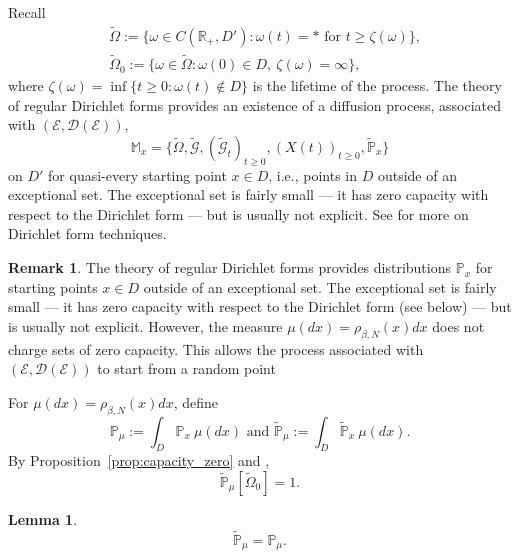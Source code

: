 \documentclass[11pt]{article}
\numberwithin{equation}{section}
\newtheorem{lemma}[theorem]{Lemma}
\theoremstyle{definition}
\newtheorem{remark}[theorem]{Remark}
\begin{document}
Recall 
\[
\begin{split}
    &\tilde\Omega := \{\omega \in C(\mathbb{R}_{+}, D'): \omega(t) = * \text{ for } t\ge \zeta(\omega)\},\\
    &\tilde\Omega_{0} := \{\omega\in \tilde\Omega: \omega(0)\in D,\ \zeta(\omega)=\infty\},
\end{split}
\]
where $\zeta(\omega) = \inf\{t\ge 0: \omega(t)\notin D\}$ is the lifetime of the process.
The theory of regular Dirichlet forms provides an existence of a diffusion process, associated with $(\mathcal{E}, \mathcal{D}(\mathcal{E}))$,
\[
    \mathbb{M}_{x} = \{\tilde\Omega, \tilde{\mathcal{G}},(\tilde{\mathcal{G}}_{t})_{t\ge 0}, (X(t))_{t\ge0}, \tilde{\mathbb{P}}_{x}\}
\]
on $D'$ for quasi-every starting point $x\in D$, i.e., points in $D$ outside of an exceptional set. The exceptional set is fairly small --- it has zero capacity with respect to the Dirichlet form --- but is usually not explicit.  See \cite{fukushima2011dirichlet, ma1992introduction} for more on Dirichlet form techniques.
\begin{remark}
    The theory of regular Dirichlet forms provides distributions $\mathbb{P}_{x}$ for starting points $x\in D$ outside of an exceptional set. The exceptional set is fairly small --- it has zero capacity with respect to the Dirichlet form (see below) --- but is usually not explicit. However, the measure $\mu(dx)=\rho_{\beta,N}(x)dx$ does not charge sets of zero capacity. This allows the process associated with $(\mathcal{E}, \mathcal{D}(\mathcal{E}))$ to start from a random point 
\end{remark}
For $\mu(dx) = \rho_{\beta,N}(x)dx$, define 
\[
    \mathbb{P}_{\mu}:= \int_{D}\mathbb{P}_{x}\ \mu(dx) \text{ and }  \tilde{\mathbb{P}}_{\mu} := \int_{D}\tilde{\mathbb{P}}_{x}\ \mu(dx).
\]
By Proposition~\ref{prop:capacity_zero} and \cite{ma1992introduction},
\[
    \tilde{\mathbb{P}}_{\mu}[\tilde\Omega_{0}]=1.
\]
\begin{lemma}
\[
        \tilde{\mathbb{P}}_{\mu} = \mathbb{P}_{\mu}.
\]
\end{lemma}
\end{document}
